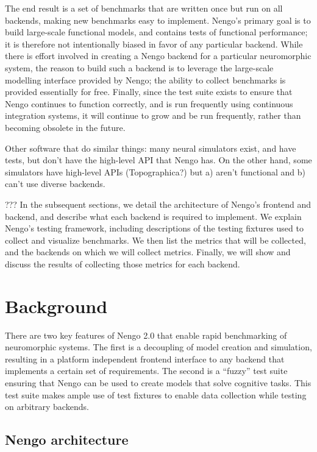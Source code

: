 \documentclass{frontiersSCNS}
\begin{document}
The end result is a set of benchmarks that
are written once but run on all backends,
making new benchmarks easy to implement.
Nengo's primary goal is to
build large-scale functional models,
and contains tests of functional performance;
it is therefore not intentionally
biased in favor of any particular backend.
While there is effort involved in creating
a Nengo backend for a particular neuromorphic system,
the reason to build such a backend
is to leverage the large-scale modelling interface
provided by Nengo;
the ability to collect benchmarks
is provided essentially for free.
Finally, since the test suite exists
to ensure that Nengo continues to function
correctly, and is run frequently using
continuous integration systems,
it will continue to grow and be run frequently,
rather than becoming obsolete in the future.

Other software that do similar things:
many neural simulators exist, and have tests,
but don't have the high-level API
that Nengo has.
On the other hand, some simulators
have high-level APIs
(Topographica?) but a) aren't functional
and b) can't use diverse backends.

??? In the subsequent sections,
we detail the architecture of Nengo's
frontend and backend,
and describe what each backend
is required to implement.
We explain Nengo's testing framework,
including descriptions of the testing fixtures
used to collect and visualize benchmarks.
We then list the metrics that will be collected,
and the backends on which we will collect metrics.
Finally, we will show and discuss
the results of collecting those metrics
for each backend.

\section{Background}

There are two key features of Nengo 2.0
that enable rapid benchmarking of neuromorphic systems.
The first is a decoupling of model creation and simulation,
resulting in a platform independent frontend interface
to any backend that implements a certain set of requirements.
The second is a ``fuzzy'' test suite ensuring that
Nengo can be used to create models that solve cognitive tasks.
This test suite makes ample use of test fixtures
to enable data collection while testing on arbitrary backends.

\subsection{Nengo architecture}
\end{document}
